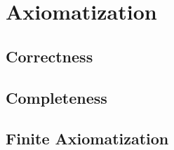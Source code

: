 \documentclass{article}
\begin{document}
\section{Axiomatization}
\subsection{Correctness}
\subsection{Completeness}
\subsection{Finite Axiomatization}
\end{document}
